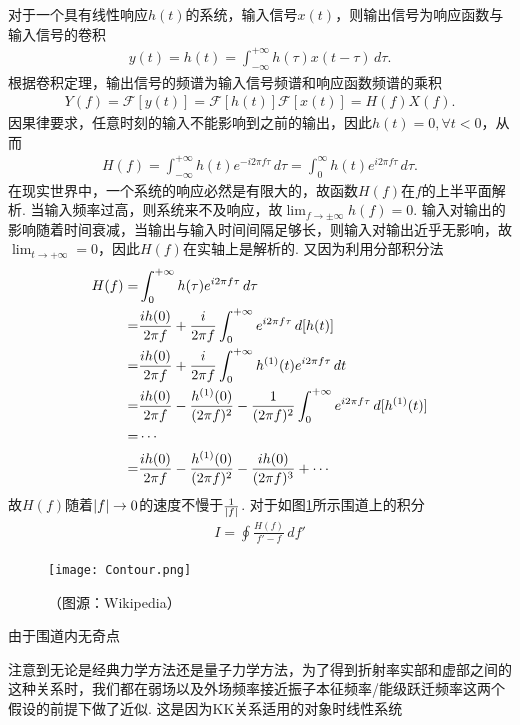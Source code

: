 \documentclass{assignment}
\begin{document}
对于一个具有线性响应$h(t)$的系统，输入信号$x(t)$，则输出信号为响应函数与输入信号的卷积
\begin{align}
    y(t)=h(t)=\int_{-\infty}^{+\infty}h(\tau)x(t-\tau)\,d\tau.
\end{align}
根据卷积定理，输出信号的频谱为输入信号频谱和响应函数频谱的乘积
\begin{align}
    Y(f)=\mathscr{F}[y(t)]=\mathscr{F}[h(t)]\mathscr{F}[x(t)]=H(f)X(f).
\end{align}
因果律要求，任意时刻的输入不能影响到之前的输出，因此$h(t)=0,\forall t<0$，从而
\begin{align}
    H(f)=\int_{-\infty}^{+\infty}h(t)e^{-i2\pi f\tau}\,d\tau=\int_0^{\infty}h(t)e^{i2\pi f\tau}\,d\tau.
\end{align}
在现实世界中，一个系统的响应必然是有限大的，故函数$H(f)$在$f$的上半平面解析. 当输入频率过高，则系统来不及响应，故$\lim_{f\rightarrow\pm\infty}h(f)=0$. 输入对输出的影响随着时间衰减，当输出与输入时间间隔足够长，则输入对输出近乎无影响，故$\lim_{t\rightarrow+\infty}=0$，因此$H(f)$在实轴上是解析的. 又因为利用分部积分法
\begin{align}
    \notag H(f)=&\int_0^{+\infty}h(\tau)e^{i2\pi f\tau}\,d\tau\\
    \notag=&\frac{ih(0)}{2\pi f}+\frac{i}{2\pi f}\int_0^{+\infty}e^{i2\pi f\tau}\,d[h(t)]\\
    \notag=&\frac{ih(0)}{2\pi f}+\frac{i}{2\pi f}\int_0^{+\infty}h^{(1)}(t)e^{i2\pi f\tau}\,dt\\
    \notag=&\frac{ih(0)}{2\pi f}-\frac{h^{(1)}(0)}{(2\pi f)^2}-\frac{1}{(2\pi f)^2}\int_0^{+\infty}e^{i2\pi f\tau}\,d[h^{(1)}(t)]\\
    \notag=&\cdots\\
    \notag=&\frac{ih(0)}{2\pi f}-\frac{h^{(1)}(0)}{(2\pi f)^2}-\frac{ih(0)}{(2\pi f)^3}+\cdots
\end{align}
故$H(f)$随着$\left\lvert f\right\rvert\rightarrow 0$的速度不慢于$\frac{1}{\left\lvert f\right\rvert}$. 对于如图\ref{contour}所示围道上的积分
\begin{align}
    I=\oint\frac{H(f)}{f'-f}\,df'
\end{align}
\begin{figure}[h]
    \centering
    \texttt{[image: Contour.png]}
    \caption{（图源：Wikipedia）}
    \label{contour}
\end{figure}
由于围道内无奇点

注意到无论是经典力学方法还是量子力学方法，为了得到折射率实部和虚部之间的这种关系时，我们都在弱场以及外场频率接近振子本征频率/能级跃迁频率这两个假设的前提下做了近似. 这是因为KK关系适用的对象时线性系统
\end{document}
